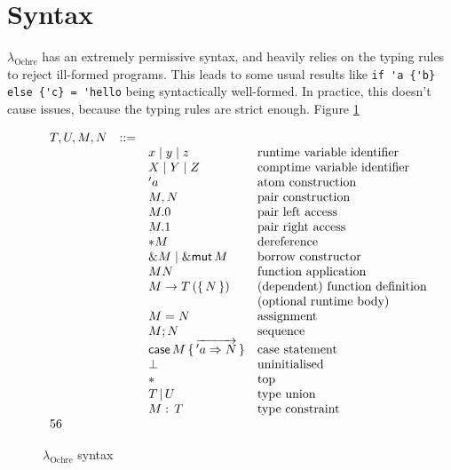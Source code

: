 \documentclass[12pt,twoside]{report}
\newcommand{\lochre}{$\lambda_\text{Ochre}$}
\begin{document}
\section{Syntax}
\lochre{} has an extremely permissive syntax, and heavily relies on the typing rules to reject ill-formed programs. This leads to some usual results like \verb|if 'a {'b} else {'c} = 'hello| being syntactically well-formed. In practice, this doesn't cause issues, because the typing rules are strict enough. Figure \ref{fig:syntax}

\begin{figure}
  \arraycolsep=1pt %
  \centering

  \vspace{-2ex} %
  \[
  \begin{array}[t]{llll}
    T, U, M, N & ::= & & \\
    && x\mid{}y\mid{}z & \text{runtime variable identifier}\\
    && X\mid{}Y\mid{}Z & \text{comptime variable identifier}\\
    && 'a & \text{atom construction}\\
    && M, N & \text{pair construction}\\
    && M.0 & \text{pair left access}\\
    && M.1 & \text{pair right access}\\
    && *M & \text{dereference}\\
    && \&M \mid \&\kw{mut}\,M & \text{borrow constructor}\\
    && M N & \text{function application}\\
    && M \rightarrow T\,(\{\,N\,\}) & \text{(dependent) function definition}\\
    && & \text{(optional runtime body)} \\
    && M = N & \text{assignment}\\
    && M; N & \text{sequence}\\
    && \kw{case}\,M\,\{\,\overrightarrow{'a \Rightarrow N}\,\} & \text{case statement}\\
    && \bot & \text{uninitialised}\\
    && * & \text{top}\\
    && T\,|\,U & \text{type union}\\
    && M:\,T & \text{type constraint}\\
56
  \end{array} %
  \]
\caption{\lochre{} syntax} %
\label{fig:syntax} %
\end{figure} %
\end{document}

